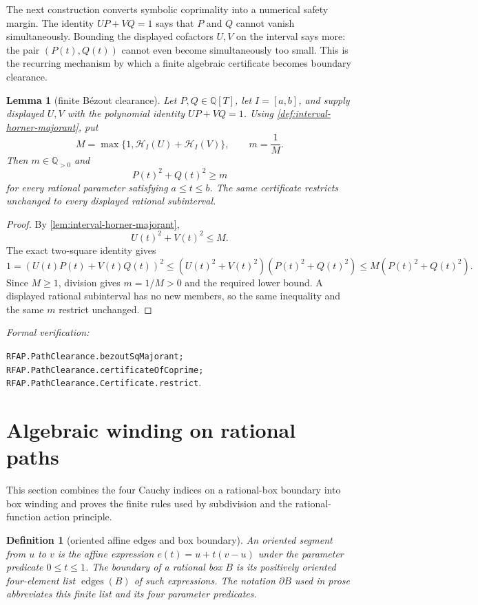 \documentclass[11pt]{article}
\newtheorem{lemma}[theorem]{Lemma}
\newtheorem{definition}[theorem]{Definition}
\newcommand{\Q}{\mathbb{Q}}
\newcommand{\leanref}[1]{\par\smallskip\noindent
  \emph{Formal verification:}\par\nobreak
  {\raggedright\nolinkurl{#1}.\par}}
\begin{document}
The next construction converts symbolic coprimality into a numerical safety
margin.  The identity $UP+VQ=1$ says that $P$ and $Q$ cannot vanish
simultaneously.  Bounding the displayed cofactors $U,V$ on the interval says
more: the pair $(P(t),Q(t))$ cannot even become simultaneously too small.
This is the recurring mechanism by which a finite algebraic certificate
becomes boundary clearance.

\begin{lemma}[finite Bézout clearance]
\label{lem:positive-lower}
Let $P,Q\in\Q[T]$, let $I=[a,b]$, and supply displayed $U,V$ with the
polynomial identity $UP+VQ=1$.  Using
\cref{def:interval-horner-majorant}, put
\[
 M=\max\{1,\mathcal H_I(U)+\mathcal H_I(V)\},
 \qquad m=\frac1M.
\]
Then $m\in\Q_{>0}$ and
\[
             P(t)^2+Q(t)^2\ge m
\]
for every rational parameter satisfying $a\le t\le b$.  The same certificate
restricts unchanged to every displayed rational subinterval.
\end{lemma}

\begin{proof}
By \cref{lem:interval-horner-majorant},
\[
                  U(t)^2+V(t)^2\le M.
\]
The exact two-square identity gives
\[
 1=(U(t)P(t)+V(t)Q(t))^2
 \le (U(t)^2+V(t)^2)(P(t)^2+Q(t)^2)
 \le M(P(t)^2+Q(t)^2).
\]
Since $M\ge1$, division gives $m=1/M>0$ and the required lower bound.  A
displayed rational subinterval has no new members, so the same inequality
and the same $m$ restrict unchanged.
\end{proof}

\leanref{RFAP.PathClearance.bezoutSqMajorant;
RFAP.PathClearance.certificateOfCoprime;
RFAP.PathClearance.Certificate.restrict}

\section{Algebraic winding on rational paths}
\label{sec:winding-realization}

This section combines the four Cauchy indices on a rational-box boundary
into box winding and proves the finite rules used by subdivision and the
rational-function action principle.

\begin{definition}[oriented affine edges and box boundary]
\label{def:oriented-box-boundary}
An oriented segment from $u$ to $v$ is the affine expression
$e(t)=u+t(v-u)$ under the parameter predicate $0\le t\le1$.  The boundary
of a rational box $B$ is its positively oriented four-element list
$\operatorname{edges}(B)$ of such expressions.  The notation $\partial B$
used in prose abbreviates this finite list and its four parameter predicates.
\end{definition}
\end{document}

